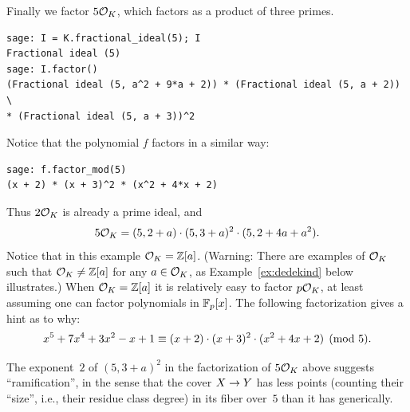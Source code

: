 \par\noindent{}Finally we factor $5\mathcal{O}_K$, which factors as a product of three
primes. 
\begin{verbatim}
sage: I = K.fractional_ideal(5); I
Fractional ideal (5)
sage: I.factor()
(Fractional ideal (5, a^2 + 9*a + 2)) * (Fractional ideal (5, a + 2)) \
* (Fractional ideal (5, a + 3))^2
\end{verbatim}
Notice that the polynomial $f$ factors in a similar way:
\begin{verbatim}
sage: f.factor_mod(5)
(x + 2) * (x + 3)^2 * (x^2 + 4*x + 2)
\end{verbatim}
Thus $2\mathcal{O}_K$ is already a prime ideal, and 
$$ 
  5\mathcal{O}_K = (5,2+a)\cdot(5,3+a)^2\cdot(5,2+4a+a^2).
$$ 
Notice that in this example $\mathcal{O}_K=\mathbb{Z}[a]$.  (Warning: There are
examples of $\mathcal{O}_K$ such that $\mathcal{O}_K\neq \mathbb{Z}[a]$ for any $a\in\mathcal{O}_K$, as
Example~\ref{ex:dedekind} below illustrates.)  When $\mathcal{O}_K=\mathbb{Z}[a]$ it is
relatively easy to factor $p\mathcal{O}_K$, at least assuming one can factor
polynomials in $\mathbb{F}_p[x]$.  The following
factorization gives a hint as to why:
$$
  x^5+7x^4+3x^2-x+1 \equiv (x+2)\cdot (x+3)^2 \cdot (x^2+4x+2)\pmod{5}.
$$

The exponent~$2$ of $(5,3+a)^2$ in the factorization of $5\mathcal{O}_K$ above
suggests ``ramification'',
in the sense that the cover $X\rightarrow Y$ has less points (counting their ``size'', i.e.,
their residue class degree) in its fiber over~$5$ than
it has generically.





